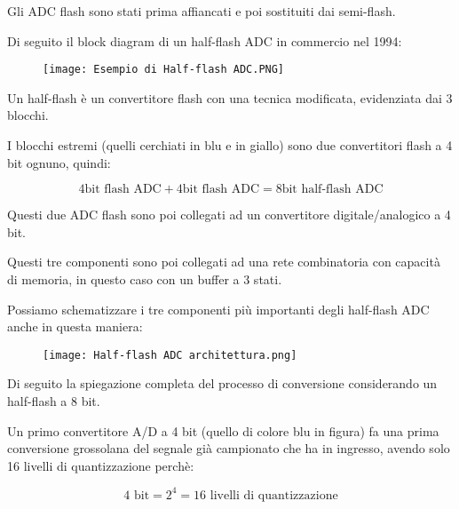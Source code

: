 Gli ADC flash sono stati prima affiancati e poi sostituiti dai semi-flash. \newline 

Di seguito il block diagram di un half-flash ADC in commercio nel 1994: 

\begin{figure}[h]
    \centering
    \texttt{[image: Esempio di Half-flash ADC.PNG]}
\end{figure}

Un half-flash è un convertitore flash con una tecnica modificata, evidenziata dai 3 blocchi. \newline 

I blocchi estremi (quelli cerchiati in blu e in giallo) sono due convertitori flash a 4 bit ognuno, quindi: 

{
    \Large 
    \begin{equation}
        4 \text{bit flash ADC} + 4 \text{bit flash ADC} = 8 \text{bit half-flash ADC} 
    \end{equation}
}

Questi due ADC flash sono poi collegati ad un convertitore digitale/analogico a 4 bit. \newline 

Questi tre componenti sono poi collegati ad una rete combinatoria con capacità di memoria, in questo caso con un buffer a 3 stati. \newline 

Possiamo schematizzare i tre componenti più importanti degli half-flash ADC anche in questa maniera: 

\begin{figure}[h]
    \centering
    \texttt{[image: Half-flash ADC architettura.png]}
\end{figure}

\newpage 

Di seguito la spiegazione completa del processo di conversione considerando un half-flash a 8 bit. \newline 

Un primo convertitore A/D a 4 bit (quello di colore blu in figura)  fa una prima conversione grossolana del segnale già campionato 
che ha in ingresso, avendo solo 16 livelli di quantizzazione perchè: 

{
    \Large 
    \begin{equation}
        4 \text{ bit} = 2^{4} = 16 \text{ livelli di quantizzazione} 
    \end{equation}
}

